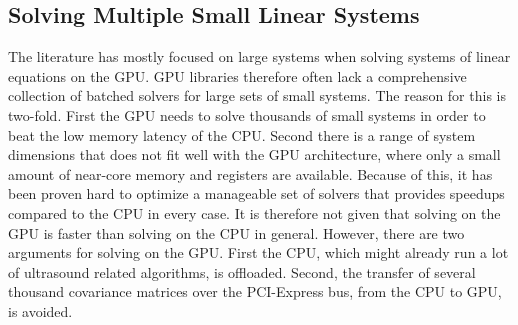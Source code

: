 \documentclass[journal]{IEEEtran}
\begin{document}

\subsection{Solving Multiple Small Linear Systems}
The literature has mostly focused on large systems when solving systems of linear equations on the GPU. GPU libraries therefore often lack a comprehensive collection of batched solvers for large sets of small systems. The reason for this is two-fold. First the GPU needs to solve thousands of small systems in order to beat the low memory latency of the CPU. Second there is a range of system dimensions that does not fit well with the GPU architecture, where only a small amount of near-core memory and registers are available. Because of this, it has been proven hard to optimize a manageable set of solvers that provides speedups compared to the CPU in every case. It is therefore not given that solving on the GPU is faster than solving on the CPU in general. However, there are two arguments for solving on the GPU. First the CPU, which might already run a lot of ultrasound related algorithms, is offloaded. Second, the transfer of several thousand covariance matrices over the PCI-Express bus, from the CPU to GPU, is avoided.
\end{document}

